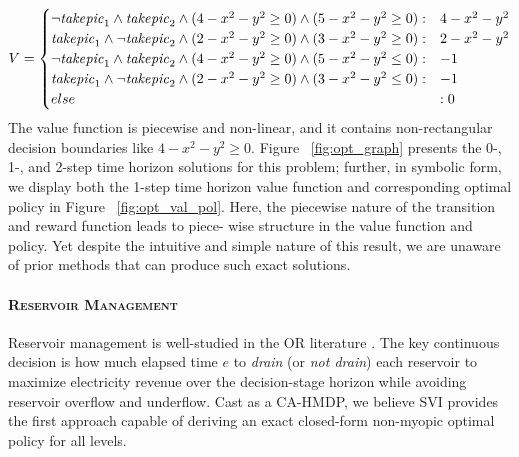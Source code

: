 \documentclass[twoside,11pt]{article}
\newcommand{\WaterReservoir}{\textsc{Reservoir Management }}
\begin{document}
{%
\begin{align*}
V = \begin{cases}
\neg \mathit{take\-pic}_1 \land \mathit{take\-pic}_2 \land (4 -x^2 -y^2\geq 0) \land 
(5 - x^2 - y^2\geq 0) : & 4 -x^2 -y^2 \\
\mathit{take\-pic}_1 \land \neg \mathit{take\-pic}_2 \land (2 -x^2 -y^2\geq 0) \land 
(3 - x^2 - y^2\geq 0) : & 2 -x^2 -y^2 \\
\neg \mathit{take\-pic}_1 \land \mathit{take\-pic}_2 \land (4 -x^2 -y^2\geq 0) \land 
(5 - x^2 - y^2\leq 0) : & -1 \\
\mathit{take\-pic}_1 \land \neg \mathit{take\-pic}_2 \land (2 -x^2 -y^2\geq 0) \land 
(3 - x^2 - y^2\leq 0) : & -1 \\
else &: 0 \\
\end{cases} 
\end{align*}
}
The value function is piecewise and non-linear, and it contains non-rectangular decision
boundaries like $4 -x^2 -y^2\geq 0$. Figure ~\ref{fig:opt_graph} presents the  0-, 1-, and 2-step time horizon solutions for this problem; further, in symbolic form, we display both the 1-step time horizon value function and corresponding optimal policy in Figure ~\ref{fig:opt_val_pol}. Here, the piecewise nature of the transition and reward function leads to piece- wise structure in the value function and policy. Yet despite the intuitive and simple nature of this result, we are unaware of prior methods that can produce such exact solutions. 

\paragraph{\WaterReservoir} 
Reservoir management is well-studied in
the OR literature \cite{Mahootchi2009,Yeh1985}.  The key continuous decision is how
much elapsed time $e$ to
\emph{drain} (or \emph{not drain}) each reservoir to maximize
electricity revenue over the decision-stage horizon while avoiding
reservoir overflow and underflow.  Cast as a CA-HMDP, we 
believe SVI provides the first approach capable of deriving
an exact closed-form non-myopic optimal policy
for all levels.
\end{document}
